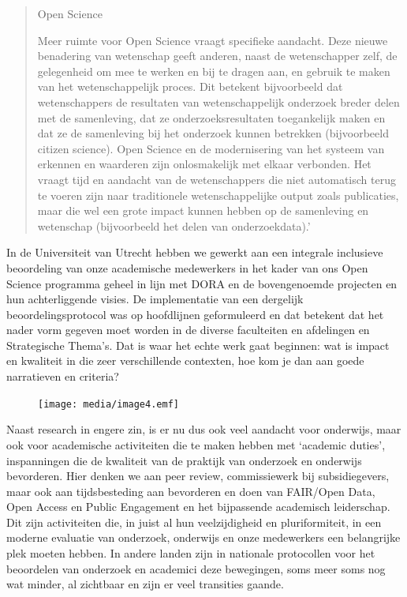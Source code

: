 \documentclass{jote-book}
\begin{document}
	\begin{quote}
		\itshape

		Open Science

		Meer ruimte voor Open Science vraagt specifieke aandacht. Deze nieuwe benadering van wetenschap geeft anderen, naast de wetenschapper zelf, de gelegenheid om mee te werken en bij te dragen aan, en gebruik te maken van het wetenschappelijk proces. Dit betekent bijvoorbeeld dat wetenschappers de resultaten van wetenschappelijk onderzoek breder delen met de samenleving, dat ze onderzoeksresultaten toegankelijk maken en dat ze de samenleving bij het onderzoek kunnen betrekken (bijvoorbeeld citizen science). Open Science en de modernisering van het systeem van erkennen en waarderen zijn onlosmakelijk met elkaar verbonden. Het vraagt tijd en aandacht van de wetenschappers die niet automatisch terug te voeren zijn naar traditionele wetenschappelijke output zoals publicaties, maar die wel een grote impact kunnen hebben op de samenleving en wetenschap (bijvoorbeeld het delen van onderzoekdata).'
	\end{quote}

	In de Universiteit van Utrecht hebben we gewerkt aan een integrale inclusieve beoordeling van onze academische medewerkers in het kader van ons Open Science programma geheel in lijn met DORA en de bovengenoemde projecten en hun achterliggende visies. De implementatie van een dergelijk beoordelingsprotocol was op hoofdlijnen geformuleerd en dat betekent dat het nader vorm gegeven moet worden in de diverse faculteiten en afdelingen en Strategische Thema's. Dat is waar het echte werk gaat beginnen: wat is impact en kwaliteit in die zeer verschillende contexten, hoe kom je dan aan goede narratieven en criteria?











	\begin{figure}
		\texttt{[image: media/image4.emf]}

		\caption{}

		\label{fig:rId19}


	\end{figure}



	Naast research in engere zin, is er nu dus ook veel aandacht voor onderwijs, maar ook voor academische activiteiten die te maken hebben met ‘academic duties', inspanningen die de kwaliteit van de praktijk van onderzoek en onderwijs bevorderen. Hier denken we aan peer review, commissiewerk bij subsidiegevers, maar ook aan tijdsbesteding aan bevorderen en doen van FAIR/Open Data, Open Access en Public Engagement en het bijpassende academisch leiderschap. Dit zijn activiteiten die, in juist al hun veelzijdigheid en pluriformiteit, in een moderne evaluatie van onderzoek, onderwijs en onze medewerkers een belangrijke plek moeten hebben. In andere landen zijn in nationale protocollen voor het beoordelen van onderzoek en academici deze bewegingen, soms meer soms nog wat minder, al zichtbaar en zijn er veel transities gaande.
\end{document}
